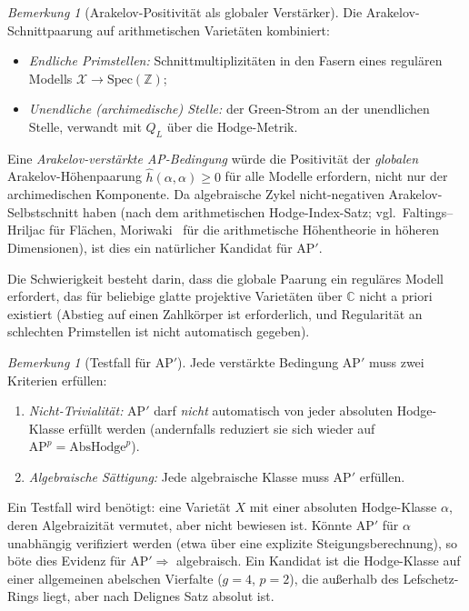 \documentclass[aps,prd,twocolumn,superscriptaddress,nofootinbib]{revtex4-2}
\theoremstyle{definition}
\theoremstyle{remark}
\newtheorem{remark}[theorem]{Bemerkung}
\begin{document}
\begin{remark}[Arakelov-Positivität als globaler Verstärker]
\label{rem:arakelov-positivity}
Die Arakelov-Schnittpaarung auf arithmetischen Varietäten kombiniert:
\begin{itemize}
\item \textit{Endliche Primstellen:} Schnittmultiplizitäten in den Fasern eines regulären Modells $\mathcal{X} \to \mathrm{Spec}(\mathbb{Z})$;
\item \textit{Unendliche (archimedische) Stelle:} der Green-Strom an der unendlichen Stelle, verwandt mit $Q_L$ über die Hodge-Metrik.
\end{itemize}
Eine \textit{Arakelov-verstärkte AP-Bedingung} würde die Positivität der \textit{globalen} Arakelov-Höhenpaarung $\hat{h}(\alpha, \alpha) \geq 0$ für alle Modelle erfordern, nicht nur der archimedischen Komponente. Da algebraische Zykel nicht-negativen Arakelov-Selbstschnitt haben (nach dem arithmetischen Hodge-Index-Satz; vgl.\ Faltings--Hriljac für Flächen, Moriwaki~\cite{Moriwaki2000} für die arithmetische Höhentheorie in höheren Dimensionen), ist dies ein natürlicher Kandidat für AP$'$.

Die Schwierigkeit besteht darin, dass die globale Paarung ein reguläres Modell erfordert, das für beliebige glatte projektive Varietäten über $\mathbb{C}$ nicht a priori existiert (Abstieg auf einen Zahlkörper ist erforderlich, und Regularität an schlechten Primstellen ist nicht automatisch gegeben).
\end{remark}

\begin{remark}[Testfall für AP$'$]
\label{rem:test-case-ap-prime}
Jede verstärkte Bedingung AP$'$ muss zwei Kriterien erfüllen:
\begin{enumerate}
\item \textit{Nicht-Trivialität:} AP$'$ darf \textit{nicht} automatisch von jeder absoluten Hodge-Klasse erfüllt werden (andernfalls reduziert sie sich wieder auf $\mathrm{AP}^p = \mathrm{AbsHodge}^p$).
\item \textit{Algebraische Sättigung:} Jede algebraische Klasse muss AP$'$ erfüllen.
\end{enumerate}
Ein Testfall wird benötigt: eine Varietät $X$ mit einer absoluten Hodge-Klasse $\alpha$, deren Algebraizität vermutet, aber nicht bewiesen ist. Könnte AP$'$ für $\alpha$ unabhängig verifiziert werden (etwa über eine explizite Steigungsberechnung), so böte dies Evidenz für AP$' \Rightarrow$ algebraisch. Ein Kandidat ist die Hodge-Klasse auf einer allgemeinen abelschen Vierfalte ($g = 4$, $p = 2$), die außerhalb des Lefschetz-Rings liegt, aber nach Delignes Satz absolut ist.
\end{remark}
\end{document}
